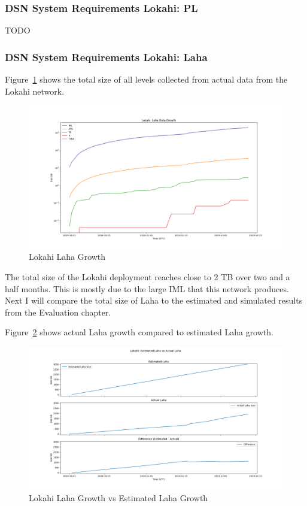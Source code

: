 \subsubsection{DSN System Requirements Lokahi: PL}

TODO

\subsubsection{DSN System Requirements Lokahi: Laha}

Figure~\ref{fig:lokahi_actual_laha} shows the total size of all levels collected from actual data from the Lokahi network.

\begin{figure}[H]
    \centering
    \includegraphics[width=\linewidth]{figures/lokahi_actual_laha.png}
    \caption{Lokahi Laha Growth}
    \label{fig:lokahi_actual_laha}
\end{figure}

The total size of the Lokahi deployment reaches close to 2 TB over two and a half months. This is mostly due to the large IML that this network produces. Next I will compare the total size of Laha to the estimated and simulated results from the Evaluation chapter.

Figure~\ref{fig:lokahi_actual_laha_vs_est} shows actual Laha growth compared to estimated Laha growth.

\begin{figure}[H]
    \centering
    \includegraphics[width=\linewidth]{figures/lokahi_actual_laha_vs_est.png}
    \caption{Lokahi Laha Growth vs Estimated Laha Growth}
    \label{fig:lokahi_actual_laha_vs_est}
\end{figure}


